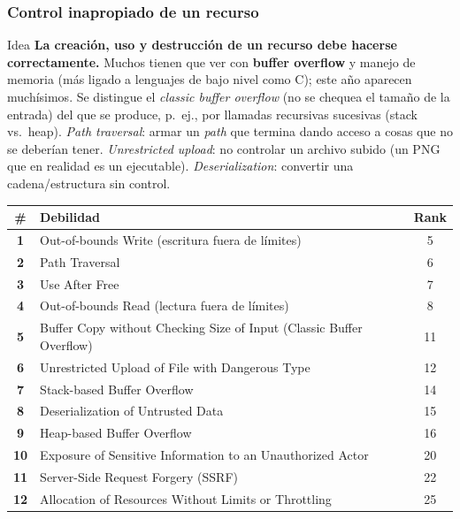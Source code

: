 \documentclass[11pt,a4paper]{article}
\begin{document}
\subsubsection{Control inapropiado de un recurso}
\begin{practbox}{Idea}
\textbf{La creación, uso y destrucción de un recurso debe hacerse correctamente.} Muchos tienen
que ver con \textbf{buffer overflow} y manejo de memoria (más ligado a lenguajes de bajo nivel
como C); este año aparecen muchísimos. Se distingue el \emph{classic buffer overflow} (no se
chequea el tamaño de la entrada) del que se produce, p.\ ej., por llamadas recursivas sucesivas
(stack vs.\ heap). \emph{Path traversal}: armar un \emph{path} que termina dando acceso a cosas
que no se deberían tener. \emph{Unrestricted upload}: no controlar un archivo subido (un PNG que
en realidad es un ejecutable). \emph{Deserialization}: convertir una cadena/estructura sin
control.
\end{practbox}
\begin{center}
\renewcommand{\arraystretch}{1.25}
\begin{tabular}{>{\bfseries}c p{8.8cm} c}
\toprule
\# & Debilidad & Rank \\
\midrule
1 & Out-of-bounds Write (escritura fuera de límites) & 5 \\
2 & Path Traversal & 6 \\
3 & Use After Free & 7 \\
4 & Out-of-bounds Read (lectura fuera de límites) & 8 \\
5 & Buffer Copy without Checking Size of Input (Classic Buffer Overflow) & 11 \\
6 & Unrestricted Upload of File with Dangerous Type & 12 \\
7 & Stack-based Buffer Overflow & 14 \\
8 & Deserialization of Untrusted Data & 15 \\
9 & Heap-based Buffer Overflow & 16 \\
10 & Exposure of Sensitive Information to an Unauthorized Actor & 20 \\
11 & Server-Side Request Forgery (SSRF) & 22 \\
12 & Allocation of Resources Without Limits or Throttling & 25 \\
\bottomrule
\end{tabular}
\end{center}
\end{document}
